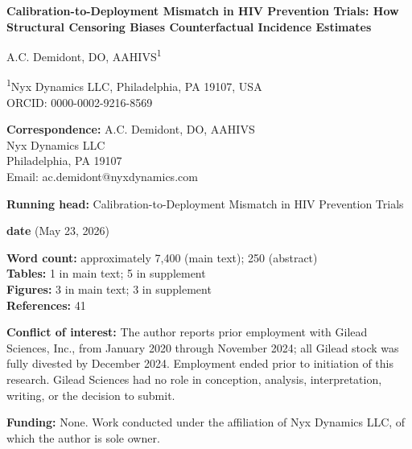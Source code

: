 \documentclass[12pt]{article}
\begin{document}
\thispagestyle{empty}
\begin{center}
\vspace*{0.5in}

{\Large \bfseries Calibration-to-Deployment Mismatch in HIV Prevention Trials: How Structural Censoring Biases Counterfactual Incidence Estimates}

\vspace{0.4in}

A.C. Demidont, DO, AAHIVS\textsuperscript{1}

\vspace{0.2in}

\small
\textsuperscript{1}Nyx Dynamics LLC, Philadelphia, PA 19107, USA \\
ORCID: 0000-0002-9216-8569

\vspace{0.3in}

\textbf{Correspondence:} A.C. Demidont, DO, AAHIVS \\
Nyx Dynamics LLC \\
Philadelphia, PA 19107 \\
Email: ac.demidont@nyxdynamics.com

\vspace{0.3in}

\textbf{Running head:} Calibration-to-Deployment Mismatch in HIV Prevention Trials

\vspace{0.2in}

\textbf{date} (May 23, 2026)

\vspace{0.2in}

\textbf{Word count:} approximately 7,400 (main text); 250 (abstract) \\
\textbf{Tables:} 1 in main text; 5 in supplement \\
\textbf{Figures:} 3 in main text; 3 in supplement \\
\textbf{References:} 41

\vspace{0.3in}

\textbf{Conflict of interest:} The author reports prior employment with Gilead Sciences, Inc., from January 2020 through November 2024; all Gilead stock was fully divested by December 2024. Employment ended prior to initiation of this research. Gilead Sciences had no role in conception, analysis, interpretation, writing, or the decision to submit.

\textbf{Funding:} None. Work conducted under the affiliation of Nyx Dynamics LLC, of which the author is sole owner.

\end{center}
\end{document}
